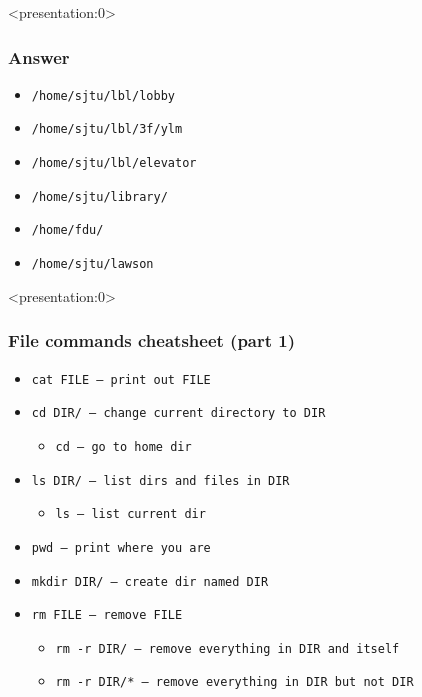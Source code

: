 \begin{frame}<presentation:0> %
\frametitle{Answer}
\begin{itemize}
    \item \tt{/home/sjtu/lbl/lobby}
    \item \tt{/home/sjtu/lbl/3f/ylm}
    \item \tt{/home/sjtu/lbl/elevator}
    \item \tt{/home/sjtu/library/}
    \item \tt{/home/fdu/}
    \item \tt{/home/sjtu/lawson}
\end{itemize}
\end{frame}

\begin{frame}<presentation:0>
\frametitle{File commands cheatsheet (part 1)}
\begin{itemize}
    \item \tt{cat FILE} — print out FILE
    \item \tt{cd DIR/} — change current directory to DIR
    \begin{itemize}
        \item \tt{cd} — go to home dir
    \end{itemize}
    \item \tt{ls DIR/} — list dirs and files in DIR
    \begin{itemize}
        \item \tt{ls} — list current dir
    \end{itemize}
    \item \tt{pwd} — print where you are
    \item \tt{mkdir DIR/} — create dir named DIR
    \item \tt{rm FILE} — remove FILE
    \begin{itemize}
        \item \tt{rm -r DIR/} — remove everything in DIR and itself
        \item \tt{rm -r DIR/*} — remove everything in DIR but not DIR
    \end{itemize}
\end{itemize}
\end{frame}

